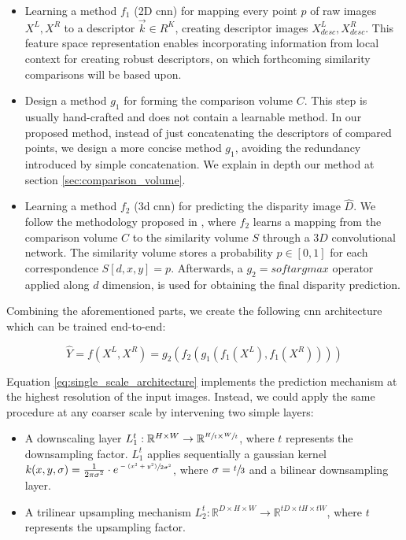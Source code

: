 \documentclass[10pt]{article}
\begin{document}
\begin{itemize}
    \item Learning a method $f_1$ (2D cnn) for mapping every point $p$ of raw images $X^L, X^R$ to a descriptor $\vec{k} \in R^K$, creating descriptor images $X^L_{desc}, X^R_{desc}$. This feature space representation enables incorporating information from local context for creating robust descriptors, on which forthcoming similarity comparisons will be based upon.
    
    \item Design a method $g_1$ for forming the comparison volume $C$. This step is usually hand-crafted and does not contain a learnable method. In our proposed method, instead of just concatenating the descriptors of compared points, we design a more concise method $g_1$, avoiding the redundancy introduced by simple concatenation. We explain in depth our method at section \ref{sec:comparison_volume}.
    
    \item Learning a method $f_2$ (3d cnn) for predicting the disparity image $\hat{D}$. We follow the methodology proposed in \cite{Kendall2017End-to-EndRegression}, where $f_2$ learns a mapping from the comparison volume $C$ to the similarity volume $S$ through a $3D$ convolutional network. The similarity volume stores a probability $p \in [0,1] $ for each correspondence $S[d,x,y] = p$. Afterwards, a $g_2=softargmax$ operator applied along $d$ dimension, is used for obtaining the final disparity prediction.
\end{itemize}

Combining the aforementioned parts, we create the following cnn architecture which can be trained end-to-end:

\begin{equation} \label{eq:single_scale_architecture}
    \hat{Y} = f(X^L, X^R) = g_2 ( f_2 ( g_1 ( f_1(X^L), f_1(X^R) ) ) )
\end{equation}

Equation \ref{eq:single_scale_architecture} implements the prediction mechanism at the highest resolution of the input images. Instead, we could apply the same procedure at any coarser scale by intervening two simple layers:

\begin{itemize}
    \item A downscaling layer $L_1^t: \mathbb{R}^{H \times W} \rightarrow \mathbb{R}^{\sfrac{H}{t} \times \sfrac{W}{t}}$, where $t$ represents the downsampling factor. $L_1^t$ applies sequentially a gaussian kernel $k(x, y, \sigma) = \frac{1}{2\pi\sigma^2} \cdot e^{\sfrac{-(x^2 + y^2)}{2\sigma^2}}$, where $\sigma = \sfrac{t}{3}$ and a bilinear downsampling layer.
    
    \item A trilinear upsampling mechanism $L_2^t: \mathbb{R}^{D \times H \times W} \rightarrow \mathbb{R}^{tD \times tH \times tW}$, where $t$ represents the upsampling factor.
\end{itemize}
\end{document}
